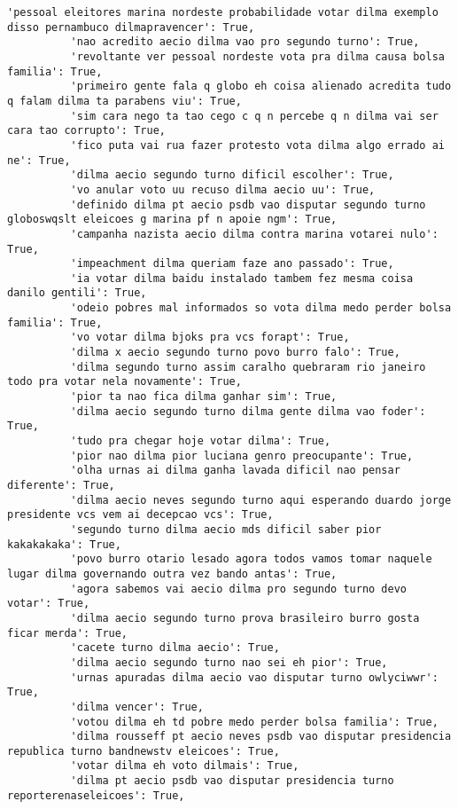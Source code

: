 \documentclass[11pt]{article}
\begin{document}
\begin{Verbatim}[commandchars=\\\{\}]
          'pessoal eleitores marina nordeste probabilidade votar dilma exemplo disso pernambuco dilmapravencer': True,
          'nao acredito aecio dilma vao pro segundo turno': True,
          'revoltante ver pessoal nordeste vota pra dilma causa bolsa familia': True,
          'primeiro gente fala q globo eh coisa alienado acredita tudo q falam dilma ta parabens viu': True,
          'sim cara nego ta tao cego c q n percebe q n dilma vai ser cara tao corrupto': True,
          'fico puta vai rua fazer protesto vota dilma algo errado ai ne': True,
          'dilma aecio segundo turno dificil escolher': True,
          'vo anular voto uu recuso dilma aecio uu': True,
          'definido dilma pt aecio psdb vao disputar segundo turno globoswqslt eleicoes g marina pf n apoie ngm': True,
          'campanha nazista aecio dilma contra marina votarei nulo': True,
          'impeachment dilma queriam faze ano passado': True,
          'ia votar dilma baidu instalado tambem fez mesma coisa danilo gentili': True,
          'odeio pobres mal informados so vota dilma medo perder bolsa familia': True,
          'vo votar dilma bjoks pra vcs forapt': True,
          'dilma x aecio segundo turno povo burro falo': True,
          'dilma segundo turno assim caralho quebraram rio janeiro todo pra votar nela novamente': True,
          'pior ta nao fica dilma ganhar sim': True,
          'dilma aecio segundo turno dilma gente dilma vao foder': True,
          'tudo pra chegar hoje votar dilma': True,
          'pior nao dilma pior luciana genro preocupante': True,
          'olha urnas ai dilma ganha lavada dificil nao pensar diferente': True,
          'dilma aecio neves segundo turno aqui esperando duardo jorge presidente vcs vem ai decepcao vcs': True,
          'segundo turno dilma aecio mds dificil saber pior kakakakaka': True,
          'povo burro otario lesado agora todos vamos tomar naquele lugar dilma governando outra vez bando antas': True,
          'agora sabemos vai aecio dilma pro segundo turno devo votar': True,
          'dilma aecio segundo turno prova brasileiro burro gosta ficar merda': True,
          'cacete turno dilma aecio': True,
          'dilma aecio segundo turno nao sei eh pior': True,
          'urnas apuradas dilma aecio vao disputar turno owlyciwwr': True,
          'dilma vencer': True,
          'votou dilma eh td pobre medo perder bolsa familia': True,
          'dilma rousseff pt aecio neves psdb vao disputar presidencia republica turno bandnewstv eleicoes': True,
          'votar dilma eh voto dilmais': True,
          'dilma pt aecio psdb vao disputar presidencia turno reporterenaseleicoes': True,

\end{Verbatim}
\end{document}
